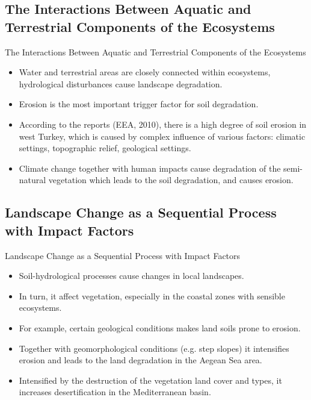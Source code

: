 \documentclass[pdflatex,compress,9pt,
	xcolor={dvipsnames,dvipsnames,svgnames,x11names,table},
	hyperref={colorlinks = true,breaklinks = true, urlcolor = NavyBlue, breaklinks = true}]{beamer}
\begin{document}
\subsection{The Interactions Between Aquatic and Terrestrial Components of the Ecosystems}
\begin{frame}{The Interactions Between Aquatic and Terrestrial Components of the Ecosystems}
\begin{itemize}
            \item Water and terrestrial areas are closely connected within ecosystems, hydrological disturbances cause landscape degradation.
            \item Erosion is the most important trigger factor for soil degradation.
            \item According to the reports (EEA, 2010), there is a high degree of soil erosion in west Turkey, which is caused by complex influence of various factors: climatic settings, topographic relief, geological settings.
            \item Climate change together with human impacts cause degradation of the semi-natural vegetation which leads to the soil degradation, and causes erosion.
\end{itemize}
\end{frame}


\subsection{Landscape Change as a Sequential Process with Impact Factors}
\begin{frame}{Landscape Change as a Sequential Process with Impact Factors}
\begin{itemize}
            \item Soil-hydrological processes cause changes in local landscapes.
            \item In turn, it affect vegetation, especially in the coastal zones with sensible ecosystems.
            \item For example, certain geological conditions makes land soils prone to erosion. 
            \item Together with geomorphological conditions (e.g. step slopes) it intensifies erosion and leads to the land degradation in the Aegean Sea area.
            \item Intensified by the destruction of the vegetation land cover and types, it increases desertification in the Mediterranean basin.
\end{itemize}
\end{frame}
\end{document}
